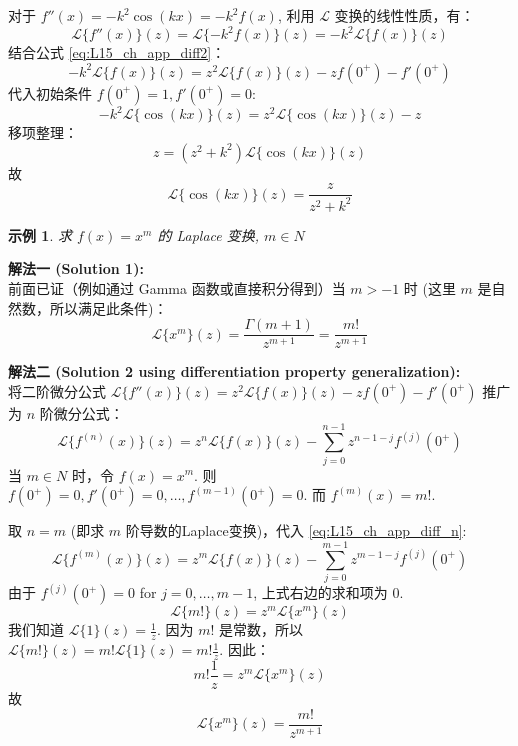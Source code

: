 \documentclass[linespread=1.5,openany]{book}%
\def\N{N}%
\theoremstyle{plain}
\newtheorem{example}[theorem]{示例}
\newcommand{\N}{\mathbb{N}}                %
\begin{document}
{{{{						对于 $f''(x) = -k^2\cos(kx) = -k^2 f(x)$, 利用 $\mathcal{L}$ 变换的线性性质，有：
						\[ \mathcal{L}\{f''(x)\}(z) = \mathcal{L}\{-k^2 f(x)\}(z) = -k^2 \mathcal{L}\{f(x)\}(z) \]
						结合公式 \eqref{eq:L15_ch_app_diff2}：
						\[ -k^2 \mathcal{L}\{f(x)\}(z) = z^2\mathcal{L}\{f(x)\}(z) - z f(0^+) - f'(0^+) \]
						代入初始条件 $f(0^+)=1, f'(0^+)=0$:
						\[ -k^2 \mathcal{L}\{\cos(kx)\}(z) = z^2\mathcal{L}\{\cos(kx)\}(z) - z\]
						移项整理：
						\[ z = (z^2+k^2)\mathcal{L}\{\cos(kx)\}(z) \]
						故
						\[ \mathcal{L}\{\cos(kx)\}(z) = \frac{z}{z^2+k^2} \]
						\vspace{1.5\baselineskip} %
						
						\begin{example}求 $f(x)=x^m$ 的 Laplace 变换, $m \in \N$ \label{ex:L15_ch_app_x_to_m}
						\end{example} %
						
						\noindent\textbf{解法一 (Solution 1):} \\
						前面已证（例如通过 Gamma 函数或直接积分得到）当 $m > -1$ 时 (这里 $m$ 是自然数，所以满足此条件)：
						\[ \mathcal{L}\{x^m\}(z) = \frac{\Gamma(m+1)}{z^{m+1}} = \frac{m!}{z^{m+1}} \]
						\vspace{\baselineskip} %
						
						\noindent\textbf{解法二 (Solution 2 using differentiation property generalization):} \\
						将二阶微分公式 $\mathcal{L}\{f''(x)\}(z) = z^2\mathcal{L}\{f(x)\}(z) - zf(0^+) - f'(0^+)$ 推广为 $n$ 阶微分公式：
						\begin{equation} \label{eq:L15_ch_app_diff_n}
							\mathcal{L}\{f^{(n)}(x)\}(z) = z^n\mathcal{L}\{f(x)\}(z) - \sum_{j=0}^{n-1} z^{n-1-j} f^{(j)}(0^+)
						\end{equation}
						当 $m \in \N$ 时，令 $f(x) = x^m$.
						则 $f(0^+) = 0, f'(0^+) = 0, \dots, f^{(m-1)}(0^+) = 0$.
						而 $f^{(m)}(x) = m!$.
						
						取 $n=m$ (即求 $m$ 阶导数的Laplace变换)，代入 \eqref{eq:L15_ch_app_diff_n}:
						\[ \mathcal{L}\{f^{(m)}(x)\}(z) = z^m\mathcal{L}\{f(x)\}(z) - \sum_{j=0}^{m-1} z^{m-1-j} f^{(j)}(0^+) \]
						由于 $f^{(j)}(0^+) = 0$ for $j=0, \dots, m-1$, 上式右边的求和项为 $0$.
						\[ \mathcal{L}\{m!\}(z) = z^m\mathcal{L}\{x^m\}(z) \]
						我们知道 $\mathcal{L}\{1\}(z) = \frac{1}{z}$. 因为 $m!$ 是常数，所以 $\mathcal{L}\{m!\}(z) = m!\mathcal{L}\{1\}(z) = m! \frac{1}{z}$.
						因此：
						\[ m! \frac{1}{z} = z^m\mathcal{L}\{x^m\}(z) \]
						故
						\[ \mathcal{L}\{x^m\}(z) = \frac{m!}{z^{m+1}} \]
						
}}}}
\end{document}
